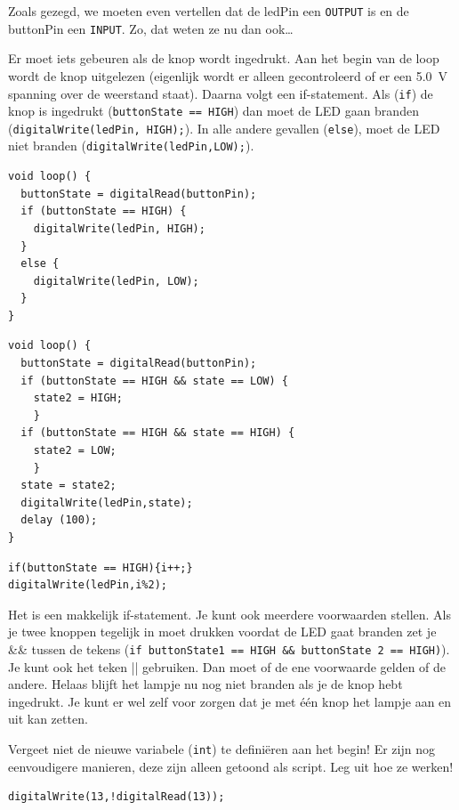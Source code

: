 \documentclass{arduino}
\begin{document}
Zoals gezegd, we moeten even vertellen dat de ledPin een \lstinline{OUTPUT} is en de buttonPin een \lstinline{INPUT}. Zo, dat weten ze nu dan ook\dots

Er moet iets gebeuren als de knop wordt ingedrukt. Aan het begin van de loop wordt de knop uitgelezen
(eigenlijk wordt er alleen gecontroleerd of er een
\SI{5.0}{\volt} spanning over de weerstand staat). Daarna volgt een if-statement. Als (\lstinline{if}) de knop is ingedrukt (\lstinline{buttonState == HIGH}) dan moet de LED gaan branden (\lstinline{digitalWrite(ledPin, HIGH);}). In alle andere gevallen (\lstinline{else}), moet de LED niet branden (\lstinline{digitalWrite(ledPin,LOW);}).

\begin{lstlisting}
void loop() {
  buttonState = digitalRead(buttonPin);
  if (buttonState == HIGH) {
    digitalWrite(ledPin, HIGH);
  }
  else {
    digitalWrite(ledPin, LOW);
  }
}
\end{lstlisting}

\begin{lstlisting}
void loop() {
  buttonState = digitalRead(buttonPin);
  if (buttonState == HIGH && state == LOW) {
    state2 = HIGH;
    }
  if (buttonState == HIGH && state == HIGH) {
    state2 = LOW;
    }
  state = state2;
  digitalWrite(ledPin,state);
  delay (100);
}
\end{lstlisting}

\begin{lstlisting}
if(buttonState == HIGH){i++;}
digitalWrite(ledPin,i%2);
\end{lstlisting}

Het is een makkelijk if-statement. Je kunt ook meerdere voorwaarden stellen. Als je twee knoppen tegelijk in moet drukken voordat de LED gaat branden zet je \&\& tussen de tekens (\lstinline{if buttonState1 == HIGH && buttonState 2 == HIGH)}).%
Je kunt ook het teken || gebruiken. Dan moet of de ene voorwaarde gelden of de andere. Helaas blijft het lampje nu nog niet branden als je de knop hebt ingedrukt. Je kunt er wel zelf voor zorgen dat je met één knop het lampje aan en uit kan zetten. 

Vergeet niet de nieuwe variabele (\lstinline{int}) te definiëren aan het begin! Er zijn nog eenvoudigere manieren, deze zijn alleen getoond als script. Leg uit hoe ze werken! 

\begin{lstlisting}
digitalWrite(13,!digitalRead(13));
\end{lstlisting}
\end{document}

